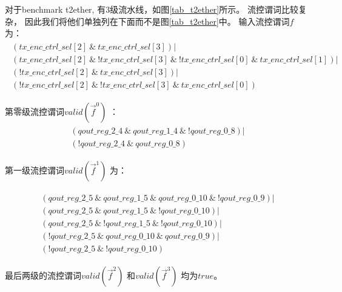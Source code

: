 对于benchmark t2ether,
有3级流水线，如图\ref{tab_t2ether}所示。
流控谓词比较复杂，
因此我们将他们单独列在下面而不是图\ref{tab_t2ether}中。
输入流控谓词$f$ 为：
\begin{multline}
\begin{array}{l}
( tx\_enc\_ctrl\_sel[2]~\&~tx\_enc\_ctrl\_sel[3] ) | \\
( tx\_enc\_ctrl\_sel[2]~\&~!tx\_enc\_ctrl\_sel[3]~\&~!tx\_enc\_ctrl\_sel[0]~\&~tx\_enc\_ctrl\_sel[1] ) | \\
( !tx\_enc\_ctrl\_sel[2]~\&~tx\_enc\_ctrl\_sel[3] ) | \\
( !tx\_enc\_ctrl\_sel[2]~\&~!tx\_enc\_ctrl\_sel[3]~\&~tx\_enc\_ctrl\_sel[0] )
\end{array}
\end{multline}

第零级流控谓词$valid(\vec{f}^0)$ ：
\begin{multline}
\begin{array}{l}
( qout\_reg\_2\_4~\&~qout\_reg\_1\_4~\&~!qout\_reg\_0\_8) | \\
( !qout\_reg\_2\_4~\&~qout\_reg\_0\_8)
\end{array}
\end{multline}

第一级流控谓词$valid(\vec{f}^1)$ 为：

\begin{multline}
\begin{array}{l}
( qout\_reg\_2\_5~\&~qout\_reg\_1\_5~\&~qout\_reg\_0\_10~\&~!qout\_reg\_0\_9) | \\
( qout\_reg\_2\_5~\&~qout\_reg\_1\_5~\&~!qout\_reg\_0\_10) | \\
( qout\_reg\_2\_5~\&~!qout\_reg\_1\_5~\&~!qout\_reg\_0\_10) | \\
( !qout\_reg\_2\_5~\&~qout\_reg\_0\_10~\&~qout\_reg\_0\_9) | \\
( !qout\_reg\_2\_5~\&~!qout\_reg\_0\_10)
\end{array}
\end{multline}


最后两级的流控谓词$valid(\vec{f}^2)$ 和$valid(\vec{f}^3)$ 均为$true$。































